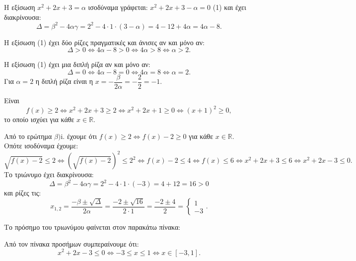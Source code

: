 
\begin{alist}
\item Η εξίσωση $x^2 + 2x + 3 = \alpha$ ισοδύναμα γράφεται:
$x^2 + 2x + 3 - \alpha = 0$ (1)
και έχει διακρίνουσα:
\[\Delta = \beta^2 - 4\alpha\gamma = 2^2 - 4 \cdot 1 \cdot (3 - \alpha) = 4 - 12 + 4\alpha = 4\alpha - 8.\]

\begin{rlist}
\item Η εξίσωση (1) έχει δύο ρίζες πραγματικές και άνισες αν και μόνο αν:
\[\Delta > 0 \Leftrightarrow 4\alpha - 8 > 0 \Leftrightarrow 4\alpha > 8 \Leftrightarrow \alpha > 2.\]

\item Η εξίσωση (1) έχει μια διπλή ρίζα αν και μόνο αν:
\[\Delta = 0 \Leftrightarrow 4\alpha - 8 = 0 \Leftrightarrow 4\alpha = 8 \Leftrightarrow \alpha = 2.\]
Για $\alpha = 2$ η διπλή ρίζα είναι η $x = -\dfrac{\beta}{2\alpha} = -\dfrac{2}{2} = -1$.
\end{rlist}

\item 
\begin{rlist}
\item Είναι
\[f(x) \ge 2 \Leftrightarrow x^2 + 2x + 3 \ge 2 \Leftrightarrow x^2 + 2x + 1 \ge 0 \Leftrightarrow (x + 1)^2 \ge 0,\]
το οποίο ισχύει για κάθε $x \in \mathbb{R}$.

\item Από το ερώτημα $\beta)$i. έχουμε ότι $f(x) \ge 2 \Leftrightarrow f(x) - 2 \ge 0$ για κάθε $x \in \mathbb{R}$. Οπότε
ισοδύναμα έχουμε:
\[\sqrt{f(x) - 2} \le 2 \Leftrightarrow \left(\sqrt{f(x) - 2}\right)^2 \le 2^2 \Leftrightarrow f(x) - 2 \le 4 \Leftrightarrow f(x) \le 6 \Leftrightarrow x^2 + 2x + 3 \le 6 \Leftrightarrow x^2 + 2x - 3 \le 0.\]
Το τριώνυμο έχει διακρίνουσα:
\[\Delta = \beta^2 - 4\alpha\gamma = 2^2 - 4 \cdot 1 \cdot (-3) = 4 + 12 = 16 > 0\]
και ρίζες τις:
\[x_{1,2} = \dfrac{-\beta \pm \sqrt{\Delta}}{2\alpha} = \dfrac{-2 \pm \sqrt{16}}{2 \cdot 1} = \dfrac{-2 \pm 4}{2} = \begin{cases} 1 \\ -3 \end{cases}.\]

Το πρόσημο του τριωνύμου φαίνεται στον παρακάτω πίνακα:

\begin{center}
\end{center}

Από τον πίνακα προσήμων συμπεραίνουμε ότι:
\[x^2 + 2x - 3 \le 0 \Leftrightarrow -3 \le x \le 1 \Leftrightarrow x \in [-3, 1].\]
\end{rlist}
\end{alist}


